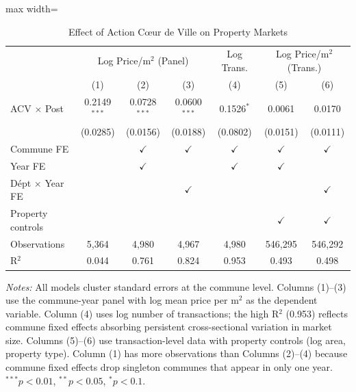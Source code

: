 \begin{table}[htbp]
   \caption{Effect of Action C\oe ur de Ville on Property Markets}
   \label{tab:main_results}
   \bigskip
   \centering
   \begin{adjustbox}{max width=\textwidth}
   \begin{tabular}{lcccccc}
      \toprule
       & \multicolumn{3}{c}{Log Price/m$^2$ (Panel)} & Log Trans. & \multicolumn{2}{c}{Log Price/m$^2$ (Trans.)}\\
                                         & (1)            & (2)            & (3)            & (4)           & (5)           & (6) \\
      \midrule
      ACV $\times$ Post                  & 0.2149$^{***}$ & 0.0728$^{***}$ & 0.0600$^{***}$ & 0.1526$^{*}$  & 0.0061        & 0.0170\\
                                         & (0.0285)       & (0.0156)       & (0.0188)       & (0.0802)      & (0.0151)      & (0.0111)\\
      \midrule
      Commune FE                         &                & $\checkmark$   & $\checkmark$   & $\checkmark$  & $\checkmark$  & $\checkmark$\\
      Year FE                            &                & $\checkmark$   &                & $\checkmark$  & $\checkmark$  & \\
      D\'{e}pt $\times$ Year FE          &                &                & $\checkmark$   &               &               & $\checkmark$\\
      Property controls                  &                &                &                &               & $\checkmark$  & $\checkmark$\\
      \midrule
      Observations                       & 5,364          & 4,980          & 4,967          & 4,980         & 546,295       & 546,292\\
      R$^2$                              & 0.044          & 0.761          & 0.824          & 0.953         & 0.493         & 0.498\\
      \bottomrule
   \end{tabular}
   \end{adjustbox}

   \par \raggedright \small
   \textit{Notes:} All models cluster standard errors at the commune level. Columns (1)--(3) use the commune-year panel with log mean price per m$^2$ as the dependent variable. Column (4) uses log number of transactions; the high R$^2$ (0.953) reflects commune fixed effects absorbing persistent cross-sectional variation in market size. Columns (5)--(6) use transaction-level data with property controls (log area, property type). Column (1) has more observations than Columns (2)--(4) because commune fixed effects drop singleton communes that appear in only one year. $^{***}p<0.01$, $^{**}p<0.05$, $^{*}p<0.1$.
\end{table}
